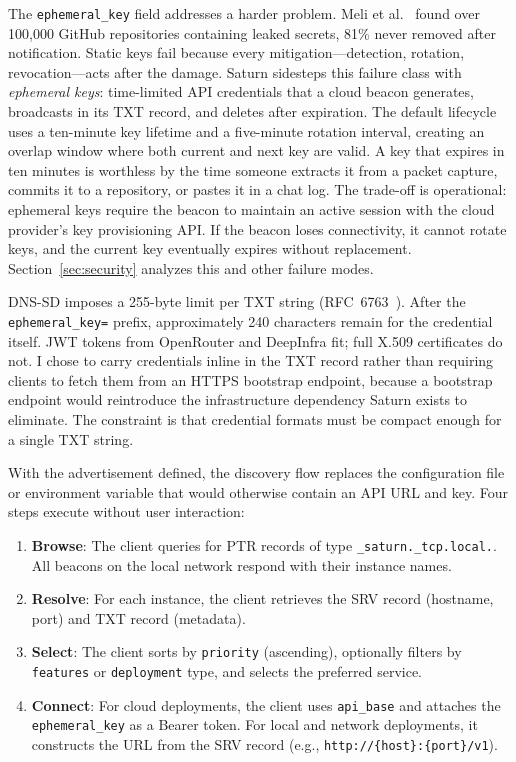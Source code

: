 \label{sec:ephemeral-keys}
The \texttt{ephemeral\_key} field addresses a harder problem. Meli et al.~\cite{meli2019secrets} found over 100,000 GitHub repositories containing leaked secrets, 81\% never removed after notification. Static keys fail because every mitigation---detection, rotation, revocation---acts after the damage. Saturn sidesteps this failure class with \emph{ephemeral keys}: time-limited API credentials that a cloud beacon generates, broadcasts in its TXT record, and deletes after expiration. The default lifecycle uses a ten-minute key lifetime and a five-minute rotation interval, creating an overlap window where both current and next key are valid. A key that expires in ten minutes is worthless by the time someone extracts it from a packet capture, commits it to a repository, or pastes it in a chat log. The trade-off is operational: ephemeral keys require the beacon to maintain an active session with the cloud provider's key provisioning API. If the beacon loses connectivity, it cannot rotate keys, and the current key eventually expires without replacement. Section~\ref{sec:security} analyzes this and other failure modes.

DNS-SD imposes a 255-byte limit per TXT string (RFC~6763~\cite{rfc6763}). After the \texttt{ephemeral\_key=} prefix, approximately 240 characters remain for the credential itself. JWT tokens from OpenRouter and DeepInfra fit; full X.509 certificates do not. I chose to carry credentials inline in the TXT record rather than requiring clients to fetch them from an HTTPS bootstrap endpoint, because a bootstrap endpoint would reintroduce the infrastructure dependency Saturn exists to eliminate. The constraint is that credential formats must be compact enough for a single TXT string.

\label{sec:discovery-flow}
With the advertisement defined, the discovery flow replaces the configuration file or environment variable that would otherwise contain an API URL and key. Four steps execute without user interaction:

\begin{enumerate}
    \item \textbf{Browse}: The client queries for PTR records of type \texttt{\_saturn.\_tcp.local.}. All beacons on the local network respond with their instance names.
    \item \textbf{Resolve}: For each instance, the client retrieves the SRV record (hostname, port) and TXT record (metadata).
    \item \textbf{Select}: The client sorts by \texttt{priority} (ascending), optionally filters by \texttt{features} or \texttt{deployment} type, and selects the preferred service.
    \item \textbf{Connect}: For cloud deployments, the client uses \texttt{api\_base} and attaches the \texttt{ephemeral\_key} as a Bearer token. For local and network deployments, it constructs the URL from the SRV record (e.g., \texttt{http://\{host\}:\{port\}/v1}).
\end{enumerate}

